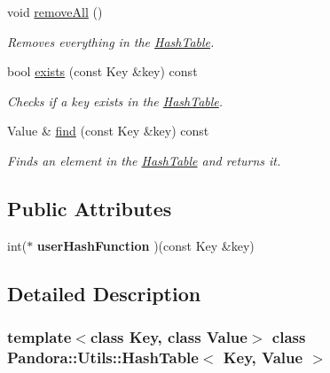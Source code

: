 \begin{DoxyCompactItemize}
void \hyperlink{classPandora_1_1Utils_1_1HashTable_af541b0c8a7ababea86db5cfda3da0a2e}{removeAll} ()
\begin{DoxyCompactList}\small\item\em Removes everything in the \hyperlink{classPandora_1_1Utils_1_1HashTable}{HashTable}. \item\end{DoxyCompactList}\item 
bool \hyperlink{classPandora_1_1Utils_1_1HashTable_a61bb5ce54f3380c10edebb59cac114cd}{exists} (const Key \&key) const 
\begin{DoxyCompactList}\small\item\em Checks if a key exists in the \hyperlink{classPandora_1_1Utils_1_1HashTable}{HashTable}. \item\end{DoxyCompactList}\item 
Value \& \hyperlink{classPandora_1_1Utils_1_1HashTable_ab1aae3564898a1de7870930f7e678de0}{find} (const Key \&key) const 
\begin{DoxyCompactList}\small\item\em Finds an element in the \hyperlink{classPandora_1_1Utils_1_1HashTable}{HashTable} and returns it. \item\end{DoxyCompactList}\end{DoxyCompactItemize}
\subsection*{Public Attributes}
\begin{DoxyCompactItemize}
\item 
\hypertarget{classPandora_1_1Utils_1_1HashTable_a88e480f18940fcecb6d1f8b034986c6d}{
int($\ast$ {\bfseries userHashFunction} )(const Key \&key)}
\label{classPandora_1_1Utils_1_1HashTable_a88e480f18940fcecb6d1f8b034986c6d}

\end{DoxyCompactItemize}


\subsection{Detailed Description}
\subsubsection*{template$<$class Key, class Value$>$ class Pandora::Utils::HashTable$<$ Key, Value $>$}

